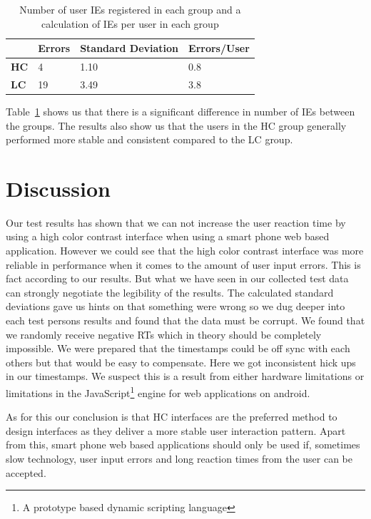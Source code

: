 \documentclass[runningheads,a4paper]{llncs}
\begin{document}
\begin{table}[]
	\centering
	\label{tab:userIE}
	\setlength{\tabcolsep}{1em}
	\setlength\extrarowheight{1em}
	\begin{tabular}{l|l|l|l}
		\textbf{} & \textbf{Errors} & \textbf{Standard Deviation} & \textbf{Errors/User} \\ \hline
		\textbf{HC} & 4 & 1.10 & 0.8 \\ \hline
		\textbf{LC} & 19 & 3.49 & 3.8
	\end{tabular}
	\caption{Number of user IEs registered in each group and a calculation of IEs per user in each group}
\end{table}

Table~\ref{tab:userIE} shows us that there is a significant difference in number of IEs between the groups. The results also show us that the users in the HC group generally performed more stable and consistent compared to the LC group.

\section{Discussion}\label{sec:discussion}
Our test results has shown that we can not increase the user reaction time by using a high color contrast interface when using a smart phone web based application. However we could see that the high color contrast interface was more reliable in performance when it comes to the amount of user input errors. This is fact according to our results. But what we have seen in our collected test data can strongly negotiate the legibility of the results. The calculated standard deviations gave us hints on that something were wrong so we dug deeper into each test persons results and found that the data must be corrupt. We found that we randomly receive negative RTs which in theory should be completely impossible. We were prepared that the timestamps could be off sync with each others but that would be easy to compensate. Here we got inconsistent hick ups in our timestamps. We suspect this is a result from either hardware limitations or limitations in the JavaScript\footnote{A prototype based dynamic scripting language} engine for web applications on android.

As for this our conclusion is that HC interfaces are the preferred method to design interfaces as they deliver a more stable user interaction pattern. Apart from this, smart phone web based applications should only be used if, sometimes slow technology, user input errors and long reaction times from the user can be accepted.
\end{document}
